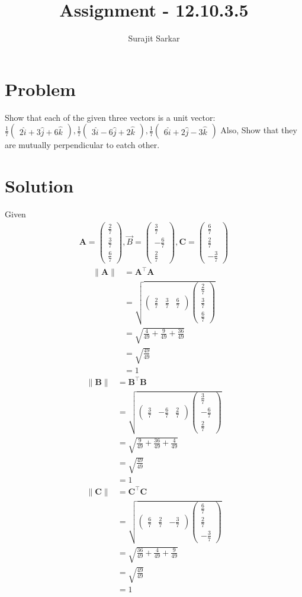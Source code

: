 \documentclass[journal,12pt,twocolumn]{IEEEtran}
\title{\mytitle}
\title{
Assignment - 12.10.3.5
}
\author{Surajit Sarkar}
\newcommand{\myvec}[1]{\ensuremath{\begin{pmatrix}#1\end{pmatrix}}}
\let\vec\mathbf
\begin{document}
\maketitle
\tableofcontents
\bigskip
\section{\textbf{Problem}}
Show that each of the given three vectors is a unit vector:$\frac{1}{7}\myvec{2\hat{i}+3\hat{j}+6\hat{k}},\frac{1}{7}\myvec{3\hat{i}-6\hat{j}+2\hat{k}},\frac{1}{7}\myvec{6\hat{i}+2\hat{j}-3\hat{k}}$
Also, Show that they are mutually perpendicular to eatch other.
\section{\textbf{Solution}}
Given
\begin{align}
\vec{A}=\myvec{\frac{2}{7}\\ \frac{3}{7}\\ \frac{6}{7}},\Vec{B}=\myvec{\frac{3}{7}\\ -\frac{6}{7}\\ \frac{2}{7}},\vec{C}=\myvec{\frac{6}{7}\\ \frac{2}{7}\\ -\frac{3}{7}}
\end{align}
\begin{align}
\|\vec{A}\|&=\vec{A}^{\top}\vec{A}\\
&=\sqrt{\myvec{\frac{2}{7}&\frac{3}{7}&\frac{6}{7}}\myvec{\frac{2}{7}\\ \frac{3}{7}\\ \frac{6}{7}}}\\
&=\sqrt{\frac{4}{49}+\frac{9}{49}+\frac{36}{49}}\\
&=\sqrt{\frac{49}{49}}\\
&=1
\end{align}
\begin{align}
\|\vec{B}\|&=\vec{B}^{\top}\vec{B}\\
&=\sqrt{\myvec{\frac{3}{7}&-\frac{6}{7}&\frac{2}{7}}\myvec{\frac{3}{7}\\ -\frac{6}{7}\\ \frac{2}{7}}}\\
&=\sqrt{\frac{9}{49}+\frac{36}{49}+\frac{4}{49}}\\
&=\sqrt{\frac{49}{49}}\\
&=1
\end{align}
\begin{align}
\|\vec{C}\|&=\vec{C}^{\top}\vec{C}\\
&=\sqrt{\myvec{\frac{6}{7}&\frac{2}{7}&-\frac{3}{7}}\myvec{\frac{6}{7}\\ \frac{2}{7}\\ -\frac{3}{7}}}\\
&=\sqrt{\frac{36}{49}+\frac{4}{49}+\frac{9}{49}}\\
&=\sqrt{\frac{49}{49}}\\
&=1
\end{align}
\end{document}
